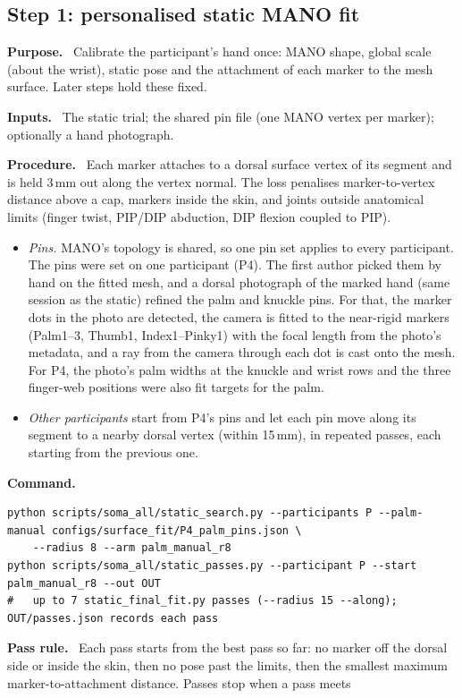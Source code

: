 \documentclass[11pt,a4paper]{article}
\newcommand{\field}[1]{\par\smallskip\noindent\textbf{#1.}\ }
\begin{document}
\subsection{Step 1: personalised static MANO fit}\label{sec:step-static}
\field{Purpose} Calibrate the participant's hand once: MANO shape, global scale (about the wrist), static pose and the
attachment of each marker to the mesh surface. Later steps hold these fixed.
\field{Inputs} The static trial; the shared pin file (one MANO vertex per marker); optionally a hand photograph.
\field{Procedure} Each marker attaches to a dorsal surface vertex of its segment and is held 3\,mm out along the
vertex normal. The loss penalises marker-to-vertex distance above a cap, markers inside the skin, and joints outside
anatomical limits (finger twist, PIP/DIP abduction, DIP flexion coupled to PIP).
\begin{itemize}[nosep]
  \item \emph{Pins.} MANO's topology is shared, so one pin set applies to every participant. The pins were set on
  one participant (P4). The first author picked them by hand on the fitted mesh, and a dorsal photograph of the marked
  hand (same session as the static) refined the palm and knuckle pins. For that, the marker dots in the photo are
  detected, the camera is fitted to the near-rigid markers (Palm1--3, Thumb1, Index1--Pinky1) with the focal length
  from the photo's metadata, and a ray from the camera through each dot is cast onto the mesh. For P4, the photo's palm
  widths at the knuckle and wrist rows and the three finger-web positions were also fit targets for the palm.
  \item \emph{Other participants} start from P4's pins and let each pin move along its segment to a nearby dorsal
  vertex (within 15\,mm), in repeated passes, each starting from the previous one.
\end{itemize}
\field{Command}
\begin{lstlisting}
python scripts/soma_all/static_search.py --participants P --palm-manual configs/surface_fit/P4_palm_pins.json \
    --radius 8 --arm palm_manual_r8
python scripts/soma_all/static_passes.py --participant P --start palm_manual_r8 --out OUT
#   up to 7 static_final_fit.py passes (--radius 15 --along); OUT/passes.json records each pass
\end{lstlisting}
\field{Pass rule} Each pass starts from the best pass so far: no marker off the dorsal side or inside the skin,
then no pose past the limits, then the smallest maximum marker-to-attachment distance. Passes stop when a pass meets
\end{document}
